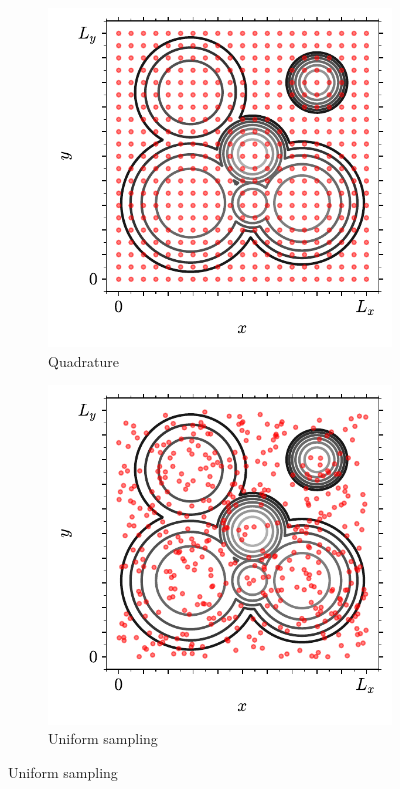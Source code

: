 \begin{figure}[btp]
     \centering
     
     \begin{subfigure}[b]{0.48\textwidth}
         \centering
         \includegraphics[width=\textwidth]{./figures/methods/mc_2d_quad.pdf}
         \caption{Quadrature}
         \label{fig:montecarloint1}
     \end{subfigure}
     \hfill
     \begin{subfigure}[b]{0.48\textwidth}
         \centering
         \includegraphics[width=\textwidth]{./figures/methods/mc_2d_rand.pdf}
         \caption{Uniform sampling}
         \label{fig:montecarloint2}
     \end{subfigure}
     \hfill
     

\end{figure}
